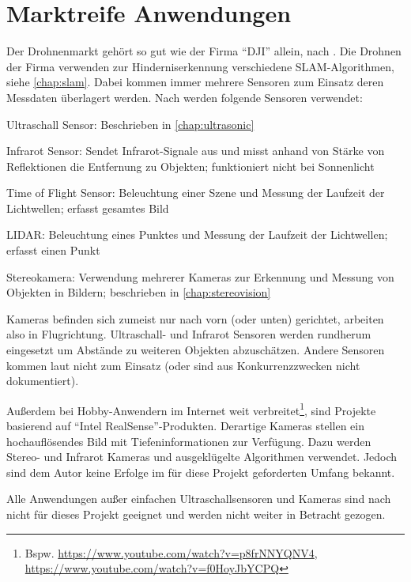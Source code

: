 \section{Marktreife Anwendungen}
Der Drohnenmarkt gehört so gut wie der Firma \enquote{DJI} allein, nach \cite{StatistikDrohnenVerkaeufeNach}. Die Drohnen der Firma verwenden zur Hinderniserkennung verschiedene SLAM-Algorithmen\cite{ciobanuObstacleAvoidanceDJI2021}, siehe \cref{chap:slam}. Dabei kommen immer mehrere Sensoren zum Einsatz deren Messdaten überlagert werden. Nach \cite{ciobanuObstacleAvoidanceDJI2021} werden folgende Sensoren verwendet:
\begin{compactdesc}
    \item[Ultraschall Sensor:] Beschrieben in \cref{chap:ultrasonic}
    \item[Infrarot Sensor:] Sendet Infrarot-Signale aus und misst anhand von Stärke von Reflektionen die Entfernung zu Objekten; funktioniert nicht bei Sonnenlicht
    \item[Time of Flight Sensor:] Beleuchtung einer Szene und Messung der Laufzeit der Lichtwellen; erfasst gesamtes Bild
    \item[LIDAR:] Beleuchtung eines Punktes und Messung der Laufzeit der Lichtwellen; erfasst einen Punkt
    \item[Stereokamera:] Verwendung mehrerer Kameras zur Erkennung und Messung von Objekten in Bildern; beschrieben in \cref{chap:stereovision} 
\end{compactdesc} 

Kameras befinden sich zumeist nur nach vorn (oder unten) gerichtet, arbeiten also in Flugrichtung. Ultraschall- und Infrarot Sensoren werden rundherum eingesetzt um Abstände zu weiteren Objekten abzuschätzen. Andere Sensoren kommen laut \cite{ciobanuObstacleAvoidanceDJI2021} nicht zum Einsatz (oder sind aus Konkurrenzzwecken nicht dokumentiert). 

Außerdem bei Hobby-Anwendern im Internet weit verbreitet\footnote{Bspw. \url{https://www.youtube.com/watch?v=p8frNNYQNV4}, \url{https://www.youtube.com/watch?v=f0HoyJbYCPQ}}, sind Projekte basierend auf \enquote{Intel RealSense}-Produkten. Derartige Kameras stellen ein hochauflösendes Bild mit Tiefeninformationen zur Verfügung. Dazu werden Stereo- und Infrarot Kameras und ausgeklügelte Algorithmen verwendet. Jedoch sind dem Autor keine Erfolge im für diese Projekt geforderten Umfang bekannt.

Alle Anwendungen außer einfachen Ultraschallsensoren und Kameras sind nach \cite[Kapitel 4.3.8]{wirthErweiterungBestehendenDrohne2022} nicht für dieses Projekt geeignet und werden nicht weiter in Betracht gezogen.

